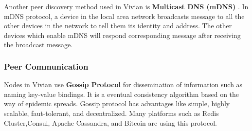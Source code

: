 Another peer discovery method used in Vivian is \textbf{Multicast DNS (mDNS)} \cite{cheshire2013multicast}. In mDNS protocol, a device in the local area network broadcasts message to all the other devices in the network to tell them its identity and address. The other devices which enable mDNS will respond corresponding message after receiving the broadcast message.

\subsubsection{Peer Communication}

Nodes in Vivian use \textbf{Gossip Protocol} \cite{10.1145/41840.41841} for dissemination of information such as naming key-value bindings. It is a eventual consistency algorithm based on the way of epidemic spreads. 
Gossip protocol has advantages like simple, highly scalable, faut-tolerant, and decentralized. Many platforms such as Redis Cluster,Consul, Apache Cassandra, and Bitcoin are using this protocol.